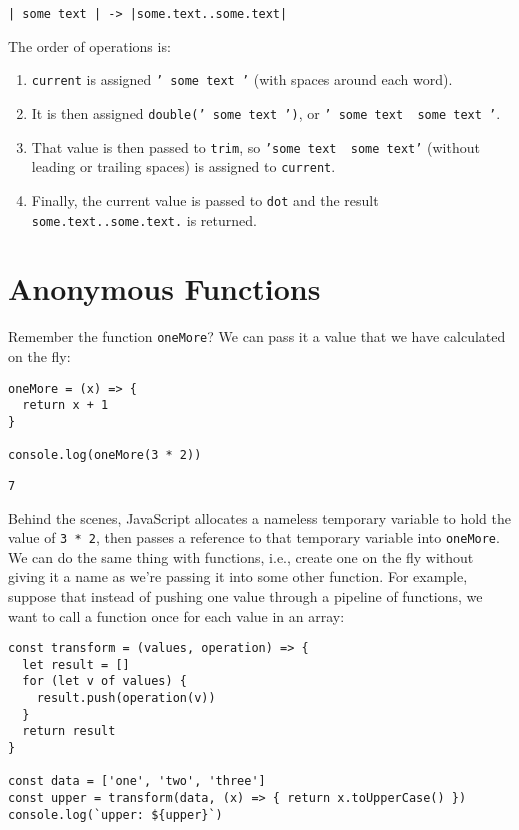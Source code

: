 \begin{verbatim}
| some text | -> |some.text..some.text|
\end{verbatim}

\noindent
The order of operations is:

\begin{enumerate}
\item
  \texttt{current} is assigned \texttt{' some text '} (with spaces around each word).
\item
  It is then assigned \texttt{double(' some text ')}, or \texttt{' some text  some text '}.
\item
  That value is then passed to \texttt{trim},
  so \texttt{'some text  some text'} (without leading or trailing spaces)
  is assigned to \texttt{current}.
\item
  Finally, the current value is passed to \texttt{dot}
  and the result \texttt{some.text..some.text.} is returned.
\end{enumerate}

\section{Anonymous Functions}\label{s:callbacks-anonymous}

Remember the function \texttt{oneMore}?
We can pass it a value that we have calculated on the fly:

\begin{verbatim}
oneMore = (x) => {
  return x + 1
}

console.log(oneMore(3 * 2))
\end{verbatim}

\begin{verbatim}
7
\end{verbatim}

Behind the scenes,
JavaScript allocates a nameless temporary variable to hold the value of \texttt{3\ *\ 2},
then passes a reference to that temporary variable into \texttt{oneMore}.
We can do the same thing with functions,
i.e., create one on the fly without giving it a name as we're passing it into some other function.
For example,
suppose that instead of pushing one value through a pipeline of functions,
we want to call a function once for each value in an array:

\begin{verbatim}
const transform = (values, operation) => {
  let result = []
  for (let v of values) {
    result.push(operation(v))
  }
  return result
}

const data = ['one', 'two', 'three']
const upper = transform(data, (x) => { return x.toUpperCase() })
console.log(`upper: ${upper}`)
\end{verbatim}

